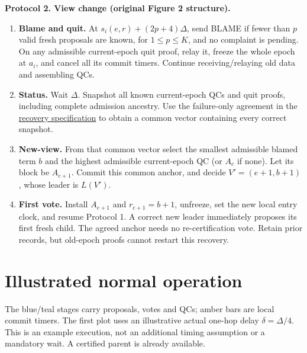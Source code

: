 \documentclass[10pt,a4paper]{article}
\newcommand{\chg}[1]{\textcolor{red!70!black}{#1}}
\begin{document}
\begin{mdframed}[linewidth=.6pt,innertopmargin=5pt,innerbottommargin=5pt]
\textbf{Protocol 2. View change (original Figure 2 structure).}
\begin{enumerate}[label=\textbf{\roman*.},itemsep=3pt]
\item \textbf{Blame and quit.} At $s_i(e,r)+(2p+4)\Delta$, send BLAME
if fewer than $p$ valid fresh proposals are known, for $1\le p\le K$,
and no complaint is pending. \chg{On any admissible current-epoch quit proof,
relay it, freeze the whole epoch at $a_i$, and cancel all its commit timers.
Continue receiving/relaying old data and assembling QCs.}
\item \textbf{Status.} Wait $\Delta$. \chg{Snapshot all known current-epoch
QCs and quit proofs, including complete admission ancestry. Use the
failure-only agreement in the \hyperref[sec:agreement]{recovery specification} to obtain a common
vector containing every correct snapshot.}
\item \textbf{New-view.} \chg{From that common vector select the smallest
admissible blamed term $b$ and the highest admissible current-epoch QC
(or $A_e$ if none). Let its block be $A_{e+1}$. Commit this common anchor,
and decide $V'=(e+1,b+1)$, whose leader is $L(V')$.}
\item \textbf{First vote.} \chg{Install $A_{e+1}$ and $r_{e+1}=b+1$, unfreeze,
set the new local entry clock, and resume Protocol 1. A correct new leader
immediately proposes its first fresh child. The agreed anchor needs no re-certification vote.
Retain prior records, but old-epoch proofs cannot restart this recovery.}
\end{enumerate}
\end{mdframed}


\clearpage
\section*{Illustrated normal operation}
The blue/teal stages carry proposals, votes and QCs; amber bars are local
commit timers. The first plot uses an illustrative actual one-hop delay
$\delta=\Delta/4$. This is an example execution, not an additional timing
assumption or a mandatory wait. A certified parent is already available.
\end{document}
